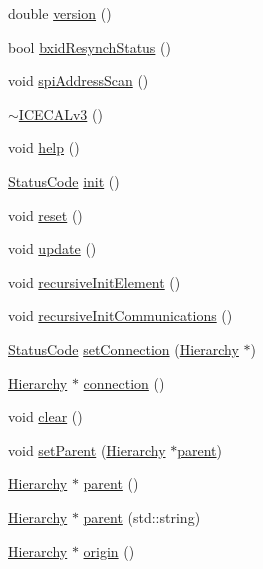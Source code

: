 \begin{DoxyCompactItemize}
\item 
double \hyperlink{classICECALv3_a7f3f8012d2e5c45f8e43819befa3f915}{version} ()
\item 
bool \hyperlink{classICECALv3_a545f51b915a6de5c5f450622d0651a85}{bxid\+Resynch\+Status} ()
\item 
void \hyperlink{classICECALv3_acbf1a7a8510d7e02280bacc58badf4f4}{spi\+Address\+Scan} ()
\item 
\hyperlink{classICECALv3_acdadf9483fc38a615192de41548024a1}{$\sim$\+I\+C\+E\+C\+A\+Lv3} ()
\item 
void \hyperlink{classICECALv3_a00e572849b4952e7cf04a39f992df037}{help} ()
\item 
\hyperlink{classStatusCode}{Status\+Code} \hyperlink{classICECALv3_abf7281fad80b80b70c5b13ce66ba3451}{init} ()
\item 
void \hyperlink{classICECALv3_a33afc7c8e0f399336152abd03cbe8d1b}{reset} ()
\item 
void \hyperlink{classICECALv3_ab2a00809e9a4f2ab83ef041a886ca637}{update} ()
\item 
void \hyperlink{classElement_a3c0abcb36f8906688bb7e32608df7086}{recursive\+Init\+Element} ()
\item 
void \hyperlink{classElement_a82119ed37dff76508a2746a853ec35ba}{recursive\+Init\+Communications} ()
\item 
\hyperlink{classStatusCode}{Status\+Code} \hyperlink{classElement_ab476b4b1df5954141ceb14f072433b89}{set\+Connection} (\hyperlink{classHierarchy}{Hierarchy} $\ast$)
\item 
\hyperlink{classHierarchy}{Hierarchy} $\ast$ \hyperlink{classElement_af57444353c1ddf9fa0109801e97debf7}{connection} ()
\item 
void \hyperlink{classHierarchy_af4d43b0765b402670eed2d62c73405af}{clear} ()
\item 
void \hyperlink{classHierarchy_a585ad1aeec16077a0e532ab8b4fc557b}{set\+Parent} (\hyperlink{classHierarchy}{Hierarchy} $\ast$\hyperlink{classHierarchy_a1c7bec8257e717f9c1465e06ebf845fc}{parent})
\item 
\hyperlink{classHierarchy}{Hierarchy} $\ast$ \hyperlink{classHierarchy_a1c7bec8257e717f9c1465e06ebf845fc}{parent} ()
\item 
\hyperlink{classHierarchy}{Hierarchy} $\ast$ \hyperlink{classHierarchy_ad550588733bf75ac5c0fcfd7c8fd11a6}{parent} (std\+::string)
\item 
\hyperlink{classHierarchy}{Hierarchy} $\ast$ \hyperlink{classHierarchy_aee461dc930ce3871636ff87f075b1b83}{origin} ()
\item 

\end{DoxyCompactItemize}
